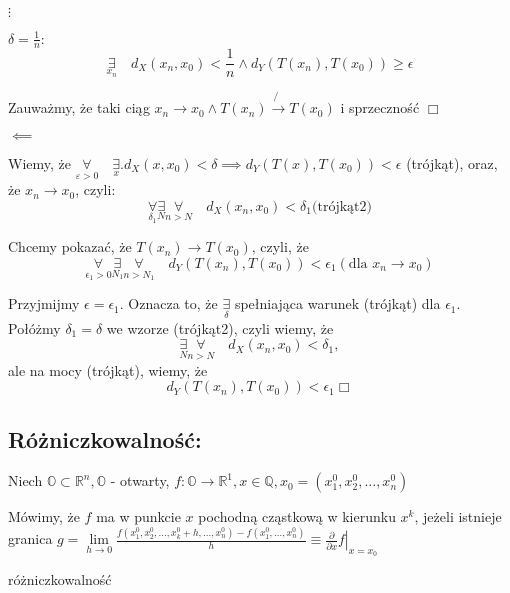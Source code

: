 \documentclass[../main.tex]{subfiles}
\begin{document}
\begin{center}$\vdots$\end{center}

    \noindent$\delta=\frac{1}{n}:$ $$\underset{x_n}{\exists} \quad d_{X}(x_{n},x_{0}) < \frac{1}{n} \land d_{Y} (T(x_{n}),T(x_{0})) \geq \epsilon$$

Zauważmy, że taki ciąg $x_{n} \to x_{0} \land T(x_{n})\not{\to} T(x_{0})$ i sprzeczność $\Box$

\vspace{0.5cm}
\begin{large}
    $\impliedby$
\end{large}
\vspace{0.5cm}
Wiemy, że $\underset{\varepsilon > 0}{\forall}\quad \underset{x}{\exists}. d_{X} (x,x_{0}) < \delta \implies d_{Y} (T(x),T(x_{0})) < \epsilon$ (trójkąt), oraz, że $x_{n} \to x_{0}$, czyli:
$$\underset{\delta_1}{\forall} \underset{N}{\exists} \underset{n>N}{\forall} \quad d_{X} (x_{n}, x_{0}) < \delta_{1} \text{(trójkąt2)}$$

Chcemy pokazać, że $T(x_n) \to T(x_0)$, czyli, że
$$\underset{\epsilon_1 > 0}{\forall} \underset{N_1}{\exists} \underset{n>N_1}{\forall} \quad d_Y (T(x_n),T(x_0)) < \epsilon_1 (\text{dla } x_n \to x_0)$$

Przyjmijmy $\epsilon=\epsilon_1$. Oznacza to, że $\underset{\delta}{\exists}$ spełniająca warunek (trójkąt) dla $\epsilon_1$. Połóżmy $\delta_1=\delta$ we wzorze (trójkąt2), czyli wiemy, że
$$\underset{N}{\exists} \underset{n>N}{\forall} \quad d_X(x_n, x_0) < \delta_1,$$
ale na mocy (trójkąt), wiemy, że
$$d_Y (T(x_n),T(x_0)) < \epsilon_1 \Box$$

\subsection{
    Różniczkowalność:
}

Niech $\mathbb{O}\subset\mathbb{R}^{n}, \mathbb{O}$ - otwarty,
$f: \mathbb{O}\to\mathbb{R}^{1}, x\in\mathbb{Q}, x_0 = (x_1^0,x_2^0,\dots,x_n^0)$

Mówimy, że $f$ ma w punkcie $x$ pochodną cząstkową w kierunku $x^k$, jeżeli istnieje granica $g = \lim\limits_{h \to 0}\frac{f(x_1^0, x_2^0, \dots, x_k^0 + h, \dots, x_n^0) - f(x_1^0,\dots,x_n^0)}{h} \equiv \left. \frac{\partial}{\partial x} f \right |_{x=x_0}$

    \begin{przyklad}
        różniczkowalność
    \end{przyklad}
\end{document}
